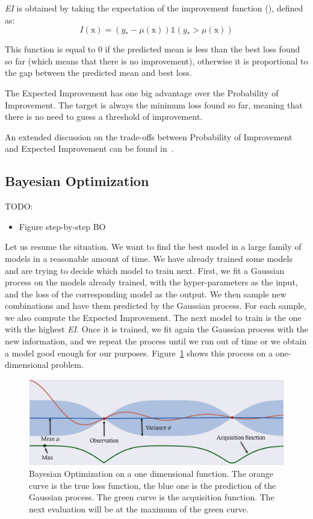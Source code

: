 \textit{EI} is obtained by taking the expectation of the improvement function (\textcite{shahriari2016IEEE}), defined as:
\begin{equation}
	I(\mathrm{x}) = \left(y_* - \mu(\mathrm{x}) \right) \mathds{1} \left(y_* > \mu(\mathrm{x}) \right)
\end{equation}

This function is equal to $0$ if the predicted mean is less than the best loss found so far (which means that there is no improvement), otherwise it is proportional to the gap between the predicted mean and best loss. 

The Expected Improvement has one big advantage over the Probability of Improvement. The target is always the minimum loss found so far, meaning that there is no need to guess a threshold of improvement. 

An extended discussion on the trade-offs between Probability of Improvement and Expected Improvement can be found in~\textcite{jones2001}.

\subsection{Bayesian Optimization}

TODO:
\begin{itemize}
    \item Figure step-by-step BO
\end{itemize}

Let us resume the situation. We want to find the best model in a large family of models in a reasonable amount of time. We have already trained some models and are trying to decide which model to train next. First, we fit a Gaussian process on the models already trained, with the hyper-parameters as the input, and the loss of the corresponding model as the output. We then sample new combinations and have them predicted by the Gaussian process. For each sample, we also compute the Expected Improvement. The next model to train is the one with the highest \textit{EI}. Once it is trained, we fit again the Gaussian process with the new information, and we repeat the process until we run out of time or we obtain a model good enough for our purposes. Figure~\ref{fig:bo} shows this process on a one-dimensional problem.

\begin{figure}[htb]
	\centering
	\includegraphics[width=\linewidth]{img_hyperopt/bo.png}
	\caption{Bayesian Optimization on a one dimensional function. The orange curve is the true loss function, the blue one is the prediction of the Gaussian process. The green curve is the acquisition function. The next evaluation will be at the maximum of the green curve.}
	\label{fig:bo}
\end{figure}

